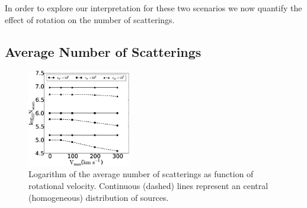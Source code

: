 \documentclass{emulateapj}
\begin{document}
In order to explore our interpretation for these two scenarios we now 
quantify the effect of rotation on the number of scatterings.

\subsection{Average Number of Scatterings}


\begin{figure}
\begin{center}
    \includegraphics[width=0.40\textwidth]{f4.eps}
\end{center}
\caption{Logarithm of the average number of scatterings as function of
  rotational velocity. Continuous (dashed) lines represent an
  central (homogeneous) distribution of sources. \label{fig:Nscatt}}    
\end{figure}
\end{document}
